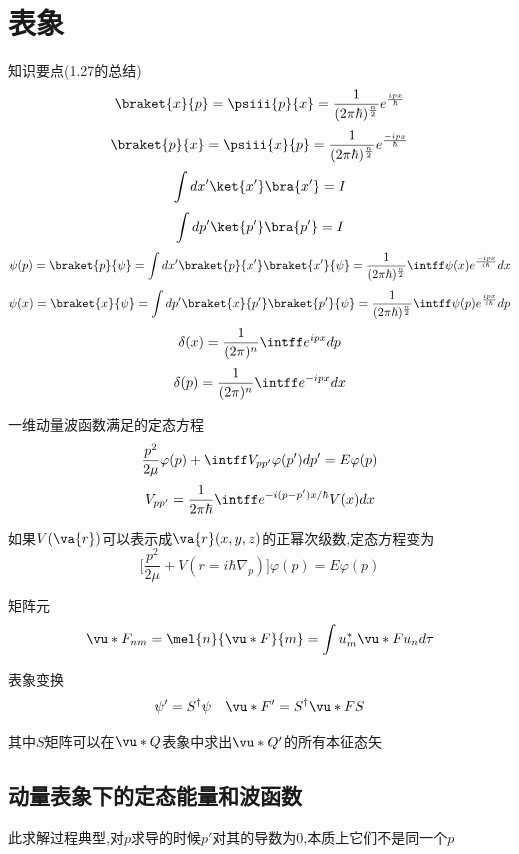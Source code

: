     \section{表象}
            \begin{formal}
                知识要点(1.27的总结)
                $$ \braket{x}{p} = \psiii{p}{x} = \frac{1}{(2 \pi \hbar)^{\frac{n}{2}}} e^{\frac{ipx}{\hbar}} $$ 
                $$ \braket{p}{x} = \psiii{x}{p} = \frac{1}{(2 \pi \hbar)^{\frac{n}{2}}} e^{\frac{-ipx}{\hbar}} $$ 
                $$ \int dx' \ket{x'} \bra{x'} = I $$ 
                $$ \int dp' \ket{p'} \bra{p'} = I $$ 
                $$ \psi(p) = \braket{p}{\psi} = \int dx' \braket{p}{x'} \braket{x'}{\psi} = \frac{1}{(2 \pi \hbar)^{\frac{n}{2}}} \intff \psi(x) e^{\frac{-ipx}{i\hbar}} dx $$
                $$ \psi(x) = \braket{x}{\psi} = \int dp' \braket{x}{p'} \braket{p'}{\psi} = \frac{1}{(2 \pi \hbar)^{\frac{n}{2}}} \intff \psi(p) e^{\frac{ipx}{i\hbar}}  dp $$
                $$ \delta(x) = \frac{1}{(2\pi)^{n}} \intff e^{ipx} dp $$
                $$ \delta(p) = \frac{1}{(2\pi)^{n}} \intff e^{-ipx} dx $$

                一维动量波函数满足的定态方程
                $$ \frac{p^{2}}{2\mu} \varphi(p) + \intff V_{pp'} \varphi(p') dp' = E\varphi(p) $$
                $$ V_{pp'} = \frac{1}{2\pi \hbar} \intff e^{-i(p-p')x/\hbar} V(x)dx $$
                
                如果$V(\va{r})$可以表示成$\va{r}(x,y,z)$的正幂次级数,定态方程变为
                $$ \big[\frac{p^{2}}{2\mu}+V(r=i\hbar \nabla_{p})\big]\varphi(p) = E\varphi(p) $$

                

                矩阵元
                $$ \vu*{F}_{nm} = \mel{n}{\vu*{F}}{m} = \int u^{*}_{m} \vu*{F} u_{n} d\tau  $$

                表象变换
                $$ \psi' = S^{\dagger} \psi \quad \vu*{F}' = S^{\dagger} \vu*{F} S $$

                其中$S$矩阵可以在$\vu*{Q}$表象中求出$\vu*{Q}'$的所有本征态矢



            \end{formal}
        
        \subsection{动量表象下的定态能量和波函数}
            此求解过程典型,对$p$求导的时候$p'$对其的导数为$0$,本质上它们不是同一个$p$
            
